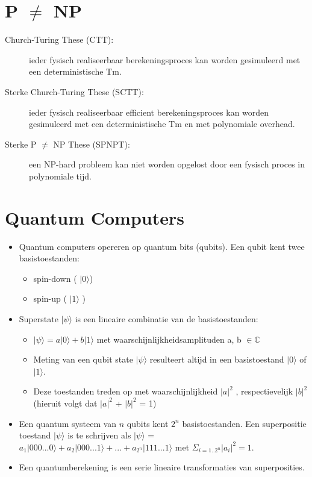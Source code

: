 \documentclass[]{article}
\begin{document}

\section*{P $\not=$ NP}

\begin{description}
\item[Church-Turing These (CTT):] ieder fysisch realiseerbaar berekeningsproces kan worden gesimuleerd met een deterministische Tm.
\item[Sterke Church-Turing These (SCTT):] ieder fysisch realiseerbaar efficient berekeningsproces kan worden gesimuleerd met een deterministische Tm en met polynomiale overhead.
\item[Sterke P $\not=$ NP These (SPNPT):] een NP-hard probleem kan niet worden opgelost door een fysisch proces in polynomiale tijd.
\end{description}

\section*{Quantum Computers}

\begin{itemize}
\item Quantum computers opereren op quantum bits (qubits). Een qubit kent twee basistoestanden:
\begin{itemize}
\item spin-down ( $|0\rangle$)
\item spin-up ( $|1\rangle$ )
\end{itemize}
\item Superstate $|\psi\rangle$ is een lineaire combinatie van de basistoestanden:
\begin{itemize}
\item $|\psi\rangle = a |0\rangle + b|1\rangle$ met waarschijnlijkheidsamplituden a, b $\in \mathbb{C}$
\item Meting van een qubit state $|\psi\rangle$ resulteert altijd in een basistoestand $|0\rangle$ of $|1\rangle$.
\item Deze toestanden treden op met waarschijnlijkheid $|a|^2$ , respectievelijk $|b|^2$ \\
(hieruit volgt dat $|a|^2$ + $|b|^2$ = 1)
\end{itemize}
\item Een quantum systeem van $n$ qubits kent $2^n$ basistoestanden. Een superpositie toestand $|\psi\rangle$ is te schrijven als $|\psi\rangle$ = $a_1|000...0\rangle + a_2|000...1\rangle + ... + a_{2^n}|111...1\rangle$ met $\Sigma_{i=1..2^n} |a_i|^2 = 1$.
\item Een quantumberekening is een serie lineaire transformaties van superposities.
\end{itemize}
\end{document}
